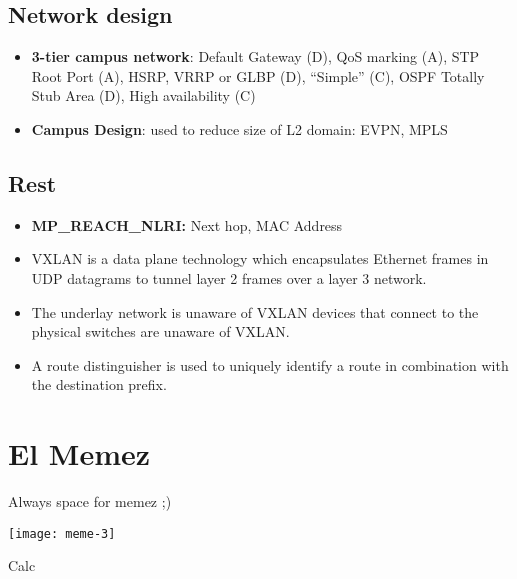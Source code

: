 \begin{multicols*}{5}
		\subsection{Network design}
		\begin{itemize}
			\item \textbf{3-tier campus network}: Default Gateway (D), QoS marking (A), STP Root Port (A), HSRP, VRRP or GLBP (D), “Simple” (C), OSPF Totally Stub Area (D), High availability (C)
			\item \textbf{Campus Design}: used to reduce size of L2 domain: EVPN, MPLS
		\end{itemize}
		\subsection{Rest}
		\begin{itemize}
			\item \textbf{MP\_REACH\_NLRI:} Next hop, MAC Address
			\item VXLAN is a data plane technology which encapsulates Ethernet frames in UDP datagrams to tunnel layer 2 frames over a layer 3 network.
			\item The underlay network is unaware of VXLAN devices that connect to the physical switches are unaware of VXLAN. 
			\item A route distinguisher is used to uniquely identify a route in combination with the destination prefix.
		\end{itemize}
		\section{El Memez}
		Always space for memez ;)
		\begin{center}
			\texttt{[image: meme-3]}
		\end{center}
		Calc
		
	\end{multicols*}
	
	
 